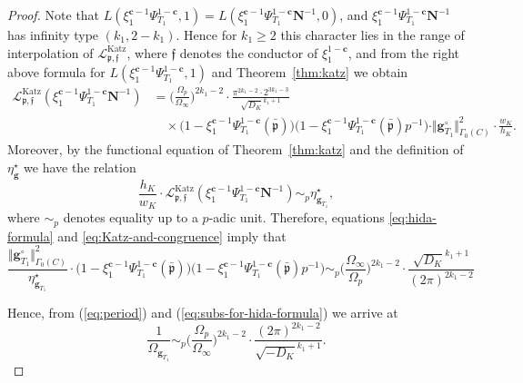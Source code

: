\documentclass[10pt,letterpaper]{amsart}
\theoremstyle{plain}
\theoremstyle{definition}
\theoremstyle{definition}
\theoremstyle{plain}
\theoremstyle{plain}
\theoremstyle{plain}
\theoremstyle{remark}
\numberwithin{equation}{section}
\newcommand{\cc}{\mathbf{c}}
\newcommand{\ch}{\xi}
\newcommand{\pp}{\mathfrak{p}}
\newcommand{\ppbar}{\bar{\mathfrak{p}}}
\def\cL{{\mathcal L}}
\def\cO{\mathcal O}
\def\Lcal{\mathcal L}
\newcommand{\dBr}[1]{\llbracket{#1}\rrbracket}
\newcommand{\bfg}{{\boldsymbol{g}}}
\begin{document}
\begin{proof}
Note that $L(\ch_1^{\cc-1}\Psi_{T_1}^{1-\cc},1)=L(\ch_1^{\cc-1}\Psi_{T_1}^{1-\cc}\mathbf{N}^{-1},0)$, and $\ch_1^{\cc-1}\Psi_{T_1}^{1-\cc}\mathbf{N}^{-1}$ has infinity type $(k_1,2-k_1)$. Hence for $k_1\geq 2$ this character lies in the range of interpolation of $\cL_{\pp,\mathfrak{f}}^{\mathrm{Katz}}$, where $\mathfrak{f}$ denotes the conductor of $\xi_1^{1-\cc}$, and from the right above formula for $L(\ch_1^{\cc-1}\Psi_{T_1}^{1-\cc},1)$ and Theorem~\ref{thm:katz} we obtain
\begin{equation}\label{eq:hida-formula}
\begin{aligned}
\cL_{\pp,\mathfrak{f}}^{\mathrm{Katz}}(\ch_1^{\cc-1}\Psi_{T_1}^{1-\cc}\mathbf{N}^{-1})&
=\biggl(\frac{\Omega_p}{\Omega_\infty}\biggr)^{2k_1-2}\cdot\frac{\pi^{2k_1-2}\cdot 2^{3k_1-3}}{\sqrt{D_K}^{k_1+1}}\\
&\quad\times\bigl(1-\ch_1^{\cc-1}\Psi^{1-\cc}_{T_1}(\ppbar)\bigr)\bigl(1-\ch_1^{\cc-1}\Psi^{1-\cc}_{T_1}(\ppbar)p^{-1}\bigr)\cdot\Vert\bfg^\circ_{T_1}\Vert_{\Gamma_0(C)}^2\cdot\frac{w_K}{h_K}.
\end{aligned}
\end{equation}
Moreover, by the functional equation of Theorem~\ref{thm:katz} 
and the definition of $\eta_{\bfg}^{\star}$ we have the relation 
\begin{equation}\label{eq:Katz-and-congruence}
    \frac{h_K}{w_K}\cdot\Lcal_{\pp,\mathfrak{f}}^{\mathrm{Katz}}(\ch_1^{\cc-1}\Psi_{T_1}^{1-\cc}\mathbf{N}^{-1})\sim_p\eta_{\bfg_{T_1}}^{\star},
\end{equation}
where $\sim_p$ denotes equality up to a $p$-adic unit. Therefore, equations \eqref{eq:hida-formula} and \eqref{eq:Katz-and-congruence} imply that
\begin{equation}\label{eq:subs-for-hida-formula}
\frac{\Vert\bfg_{T_1}^\circ\Vert_{\Gamma_0(C)}^2}{\eta_{\bfg_{T_1}}^{\star}}\cdot\bigl(1-\ch_1^{\cc-1}\Psi_{T_1}^{1-\cc}(\ppbar)\bigr)\bigl(1-\ch_1^{\cc-1}\Psi^{1-\cc}_{T_1}(\ppbar)p^{-1}\bigr)\sim_p  \biggl(\frac{\Omega_\infty}{\Omega_p}\biggr)^{2k_1-2}\cdot\frac{\sqrt{D_K}^{k_1+1}}{(2\pi)^{2k_1-2}}   
\end{equation}

Hence, from (\ref{eq:period}) and (\ref{eq:subs-for-hida-formula}) we arrive at
\begin{equation}\label{eq:Omega-bis}
\frac{1}{\Omega_{\bfg_{T_1}}}\sim_p\biggl(\frac{\Omega_p}{\Omega_\infty}\biggr)^{2k_1-2}\cdot\frac{(2\pi)^{2k_1-2}}{\sqrt{-D_K}^{k_1+1}}.
\end{equation}


\end{proof}
\end{document}

